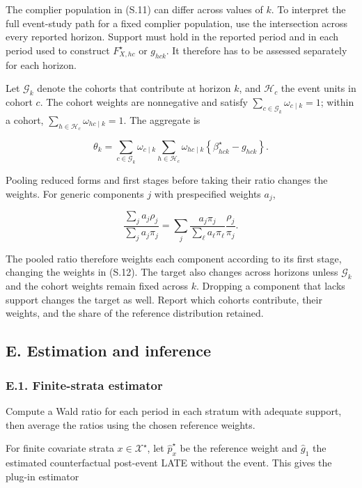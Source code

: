 \documentclass[
  11pt,
]{article}
\begin{document}
The complier population in (S.11) can differ across values of \(k\). To
interpret the full event-study path for a fixed complier population, use
the intersection across every reported horizon. Support must hold in the
reported period and in each period used to construct \(F_{X,hc}^\star\)
or \(g_{hck}\). It therefore has to be assessed separately for each
horizon.

Let \(\mathcal G_k\) denote the cohorts that contribute at horizon
\(k\), and \(\mathcal H_c\) the event units in cohort \(c\). The cohort
weights are nonnegative and satisfy
\(\sum_{c\in\mathcal G_k}\omega_{c\mid k}=1\); within a cohort,
\(\sum_{h\in\mathcal H_c}\omega_{hc\mid k}=1\). The aggregate is

\[
\theta_k
=\sum_{c\in\mathcal G_k}\omega_{c\mid k}
\sum_{h\in\mathcal H_c}\omega_{hc\mid k}
\left\{
\beta_{hck}^\star
-g_{hck}
\right\}.
\tag{S.12}
\]

Pooling reduced forms and first stages before taking their ratio changes
the weights. For generic components \(j\) with prespecified weights
\(a_j\),

\[
\frac{\sum_j a_j\rho_j}{\sum_j a_j\pi_j}
=\sum_j
\frac{a_j\pi_j}{\sum_\ell a_\ell\pi_\ell}
\frac{\rho_j}{\pi_j}.
\tag{S.13}
\]

The pooled ratio therefore weights each component according to its first
stage, changing the weights in (S.12). The target also changes across
horizons unless \(\mathcal G_k\) and the cohort weights remain fixed
across \(k\). Dropping a component that lacks support changes the target
as well. Report which cohorts contribute, their weights, and the share
of the reference distribution retained.

\hypertarget{e.-estimation-and-inference}{%
\subsection{E. Estimation and
inference}\label{e.-estimation-and-inference}}

\hypertarget{e.1.-finite-strata-estimator}{%
\subsubsection{E.1. Finite-strata
estimator}\label{e.1.-finite-strata-estimator}}

Compute a Wald ratio for each period in each stratum with adequate
support, then average the ratios using the chosen reference weights.

For finite covariate strata \(x\in\mathcal X^\star\), let
\(\widehat p_x^\star\) be the reference weight and \(\widehat g_1\) the
estimated counterfactual post-event LATE without the event. This gives
the plug-in estimator
\end{document}
